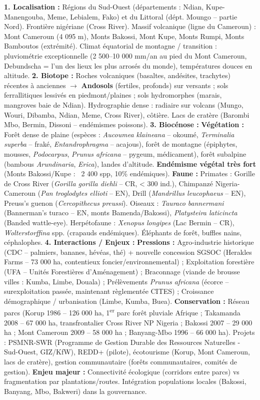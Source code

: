 \documentclass[11pt]{article}
\begin{document}
\begin{corrige}
\textbf{1. Localisation :} Régions du Sud-Ouest (départements : Ndian, Kupe-Manengouba, Meme, Lebialem, Fako) et du Littoral (dépt. Moungo -- partie Nord). Frontière nigériane (Cross River). Massif volcanique (ligne du Cameroun) : Mont Cameroun (4 095 m), Monts Bakossi, Mont Kupe, Monts Rumpi, Monts Bamboutos (extrémité). Climat équatorial de montagne / transition : pluviométrie exceptionnelle (2 500--10 000 mm/an au pied du Mont Cameroun, Debundscha = l'un des lieux les plus arrosés du monde), températures douces en altitude.
\textbf{2. Biotope :} Roches volcaniques (basaltes, andésites, trachytes) récentes à anciennes $\rightarrow$ \textbf{Andosols} (fertiles, profonds) sur versants ; sols ferrallitiques lessivés en piedmont/plaines ; sols hydromorphes (marais, mangroves baie de Ndian). Hydrographie dense : radiaire sur volcans (Mungo, Wouri, Dibamba, Ndian, Meme, Cross River), côtière. Lacs de cratère (Barombi Mbo, Bermin, Dissoni -- endémismes poissons).
\textbf{3. Biocénose :} \textbf{Végétation :} Forêt dense de plaine (espèces : \emph{Aucoumea klaineana} -- okoumé, \emph{Terminalia superba} -- fraké, \emph{Entandrophragma} -- acajous), forêt de montagne (épiphytes, mousses, \emph{Podocarpus}, \emph{Prunus africana} -- pygeum, médicament), forêt subalpine (bambous \emph{Arundinaria}, \emph{Erica}), landes d'altitude. \textbf{Endémisme végétal très fort} (Monts Bakossi/Kupe : ~2 400 spp, 10\% endémiques). \textbf{Faune :} Primates : Gorille de Cross River (\emph{Gorilla gorilla diehli} -- CR, < 300 ind.), Chimpanzé Nigeria-Cameroun (\emph{Pan troglodytes ellioti} -- EN), Drill (\emph{Mandrillus leucophaeus} -- EN), Preuss's guenon (\emph{Cercopithecus preussi}). Oiseaux : \emph{Tauraco bannermani} (Bannerman's turaco -- EN, monts Bamenda/Bakossi), \emph{Platysteira laticincta} (Banded wattle-eye). Herpétofaune : \emph{Xenopus longipes} (Lac Bermin -- CR), \emph{Wolterstorffina} spp. (crapauds endémiques). Éléphants de forêt, buffles nains, céphalophes.
\textbf{4. Interactions / Enjeux :} \textbf{Pressions :} Agro-industrie historique (CDC -- palmiers, bananes, hévéas, thé) + nouvelle concession SGSOC (Herakles Farms -- 73 000 ha, contentieux foncier/environnemental) ; Exploitation forestière (UFA -- Unités Forestières d'Aménagement) ; Braconnage (viande de brousse villes : Kumba, Limbe, Douala) ; Prélèvements \emph{Prunus africana} (écorce -- surexploitation passée, maintenant règlementée CITES) ; Croissance démographique / urbanisation (Limbe, Kumba, Buea). \textbf{Conservation :} Réseau parcs (Korup 1986 -- 126 000 ha, 1\textsuperscript{er} parc forêt pluviale Afrique ; Takamanda 2008 -- 67 000 ha, transfrontalier Cross River NP Nigeria ; Bakossi 2007 -- 29 000 ha ; Mont Cameroun 2009 -- 58 000 ha ; Banyang-Mbo 1996 -- 66 000 ha). Projets : PSMNR-SWR (Programme de Gestion Durable des Ressources Naturelles - Sud-Ouest, GIZ/KfW), REDD+ (pilote), écotourisme (Korup, Mont Cameroun, lacs de cratère), gestion communautaire (forêts communautaires, comités de gestion). \textbf{Enjeu majeur :} Connectivité écologique (corridors entre parcs) vs fragmentation par plantations/routes. Intégration populations locales (Bakossi, Banyang, Mbo, Bakweri) dans la gouvernance.

\end{corrige}
\end{document}
